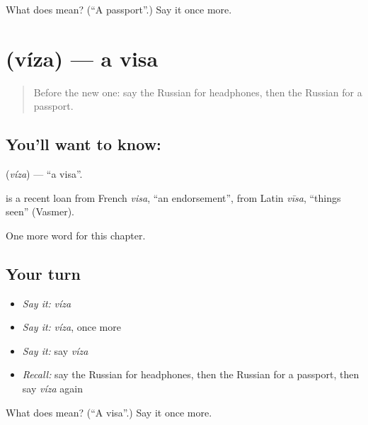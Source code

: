 \begin{tcolorbox}[breakable,colback=teal!4,colframe=teal!35!black,title={Before you move on}]
What does  mean? (\textquotedblleft{}A passport\textquotedblright{}.) Say it once more.
\end{tcolorbox}
\section[\texorpdfstring{\ru{виза} (víza)}{виза (víza)}]{ (víza) — a visa}

\label{lesson:RU-C247-viza}



\begin{quote}
Before the new one: say the Russian for headphones, then the Russian for a passport.
\end{quote}

\subsection*{You'll want to know: }
\textbf{} (\emph{víza}) — \textquotedblleft{}a visa\textquotedblright{}.

\begin{cousinweb}
\textbf{} is a recent loan from French \emph{visa}, \textquotedblleft{}an endorsement\textquotedblright{}, from Latin \emph{vīsa}, \textquotedblleft{}things seen\textquotedblright{} (Vasmer).
\end{cousinweb}

\begin{grammarlens}[title={What you've built}]
One more word for this chapter.
\end{grammarlens}

\subsection*{Your turn}
\begin{itemize}
\raggedright
  \item \emph{Say it:} \emph{víza}
  \item \emph{Say it:} \emph{víza}, once more
  \item \emph{Say it:} say \emph{víza}
  \item \emph{Recall:} say the Russian for headphones, then the Russian for a passport, then say \emph{víza} again
\end{itemize}

\begin{tcolorbox}[breakable,colback=teal!4,colframe=teal!35!black,title={Before you move on}]
What does  mean? (\textquotedblleft{}A visa\textquotedblright{}.) Say it once more.
\end{tcolorbox}
